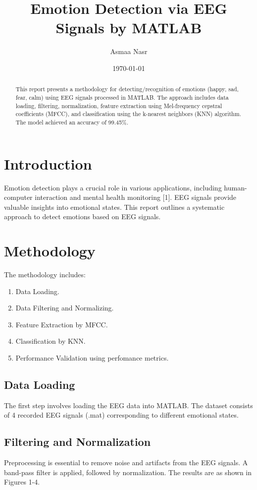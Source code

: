 \documentclass{article}
\title{Emotion Detection via EEG Signals by MATLAB}
\author{Asmaa Nasr}
\date{\today}
\begin{document}
\maketitle

\begin{abstract}
This report presents a methodology for detecting/recognition of emotions (happy, sad, fear, calm) using EEG signals processed in MATLAB. The approach includes data loading, filtering, normalization, feature extraction using Mel-frequency cepstral coefficients (MFCC), and classification using the k-nearest neighbors (KNN) algorithm. The model achieved an accuracy of 99.45\%.
\end{abstract}

\section{Introduction}
Emotion detection plays a crucial role in various applications, including human-computer interaction and mental health monitoring [1]. EEG signals provide valuable insights into emotional states. This report outlines a systematic approach to detect emotions based on EEG signals.

\section{Methodology}
The methodology includes:
\begin{enumerate}
\item Data Loading.
\item Data Filtering and Normalizing.
\item Feature Extraction by MFCC.
\item Classification by KNN.
\item Performance Validation using perfomance metrics.
\end{enumerate}
\subsection{Data Loading}
The first step involves loading the EEG data into MATLAB. The dataset consists of 4 recorded EEG signals (.mat) corresponding to different emotional states. 

\subsection{Filtering and Normalization}
Preprocessing is essential to remove noise and artifacts from the EEG signals. A band-pass filter is applied, followed by normalization.
The results are as shown in Figures 1-4.
\end{document}
